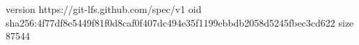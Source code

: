 version https://git-lfs.github.com/spec/v1
oid sha256:4f77df8e5449f81f0d8caf0f407dc494e35f1199ebbdb2058d5245fbec3cd622
size 87544
